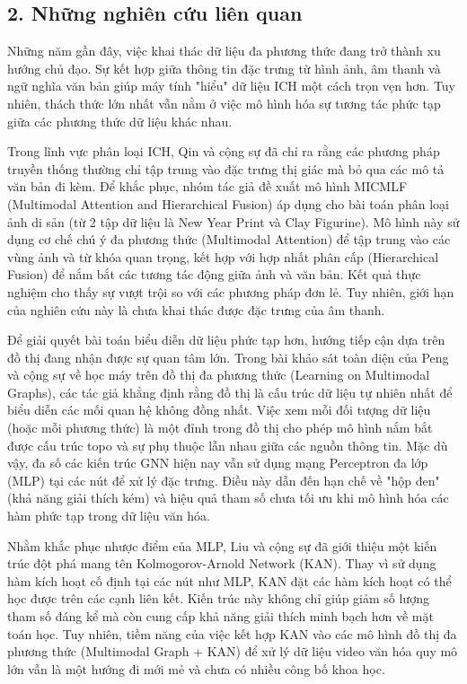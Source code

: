 \subsection{2. Những nghiên cứu liên quan}
\indent\indent Những năm gần đây, việc khai thác dữ liệu đa phương thức đang trở thành xu hướng chủ đạo. Sự kết hợp giữa thông tin đặc trưng từ hình ảnh, âm thanh và ngữ nghĩa văn bản giúp máy tính "hiểu" dữ liệu ICH một cách trọn vẹn hơn. Tuy nhiên, thách thức lớn nhất vẫn nằm ở việc mô hình hóa sự tương tác phức tạp giữa các phương thức dữ liệu khác nhau.\vspace{0.3cm}

Trong lĩnh vực phân loại ICH, Qin và cộng sự \cite{FAN2023120555} đã chỉ ra rằng các phương pháp truyền thống thường chỉ tập trung vào đặc trưng thị giác mà bỏ qua các mô tả văn bản đi kèm. Để khắc phục, nhóm tác giả đề xuất mô hình MICMLF (Multimodal Attention and Hierarchical Fusion) áp dụng cho bài toán phân loại ảnh di sản (từ 2 tập dữ liệu là New Year Print và Clay Figurine). Mô hình này sử dụng cơ chế chú ý đa phương thức (Multimodal Attention) để tập trung vào các vùng ảnh và từ khóa quan trọng, kết hợp với hợp nhất phân cấp (Hierarchical Fusion) để nắm bắt các tương tác động giữa ảnh và văn bản. Kết quả thực nghiệm cho thấy sự vượt trội so với các phương pháp đơn lẻ. Tuy nhiên, giới hạn của nghiên cứu này là chưa khai thác được đặc trưng của âm thanh.\vspace{0.3cm}

Để giải quyết bài toán biểu diễn dữ liệu phức tạp hơn, hướng tiếp cận dựa trên đồ thị đang nhận được sự quan tâm lớn. Trong bài khảo sát toàn diện của Peng và cộng sự \cite{peng2024learningmultimodalgraphssurvey} về học máy trên đồ thị đa phương thức (Learning on Multimodal Graphs), các tác giả khẳng định rằng đồ thị là cấu trúc dữ liệu tự nhiên nhất để biểu diễn các mối quan hệ không đồng nhất. Việc xem mỗi đối tượng dữ liệu (hoặc mỗi phương thức) là một đỉnh trong đồ thị cho phép mô hình nắm bắt được cấu trúc topo và sự phụ thuộc lẫn nhau giữa các nguồn thông tin. Mặc dù vậy, đa số các kiến trúc GNN hiện nay vẫn sử dụng mạng Perceptron đa lớp (MLP) tại các nút để xử lý đặc trưng. Điều này dẫn đến hạn chế về "hộp đen" (khả năng giải thích kém) và hiệu quả tham số chưa tối ưu khi mô hình hóa các hàm phức tạp trong dữ liệu văn hóa.\vspace{0.3cm}

Nhằm khắc phục nhược điểm của MLP, Liu và cộng sự \cite{liu2025kankolmogorovarnoldnetworks} đã giới thiệu một kiến trúc đột phá mang tên Kolmogorov-Arnold Network (KAN). Thay vì sử dụng hàm kích hoạt cố định tại các nút như MLP, KAN đặt các hàm kích hoạt có thể học được trên các cạnh liên kết. Kiến trúc này không chỉ giúp giảm số lượng tham số đáng kể mà còn cung cấp khả năng giải thích minh bạch hơn về mặt toán học. Tuy nhiên, tiềm năng của việc kết hợp KAN vào các mô hình đồ thị đa phương thức (Multimodal Graph + KAN) để xử lý dữ liệu video văn hóa quy mô lớn vẫn là một hướng đi mới mẻ và chưa có nhiều công bố khoa học.\vspace{0.3cm}

